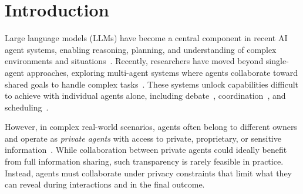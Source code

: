 \section{Introduction}
\label{sec:introduction}

Large language models (LLMs) have become a central component in recent AI agent systems, enabling reasoning, planning, and understanding of complex environments and situations~\citep{Yang2023AutoGPTDecisionMaking, Zhou2023AgentsFramework, wang2023voyager, zhou2023webarena, chae2025web, kwon2025embodied}.
Recently, researchers have moved beyond single-agent approaches, exploring multi-agent systems where agents collaborate toward shared goals to handle complex tasks~\citep{guo2024llm-mas, tran2025multiagent}.
These systems unlock capabilities difficult to achieve with individual agents alone, including debate~\citep{du2023improving}, coordination~\citep{dong2024villageragent}, and scheduling~\citep{wijerathne2025scheduleme}.

However, in complex real-world scenarios, agents often belong to different owners and operate as \emph{private agents} with access to private, proprietary, or sensitive information~\citep{li2024personalLLMagents, kirk2024benefits, li2024helloagain, zhang2025personaagentlargelanguagemodel}. 
While collaboration between private agents could ideally benefit from full information sharing, such transparency is rarely feasible in practice.
Instead, agents must collaborate under privacy constraints that limit what they can reveal during interactions and in the final outcome.

